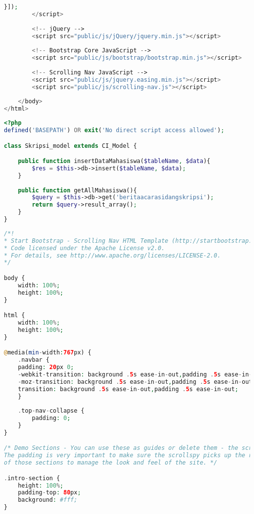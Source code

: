 \begin{lstlisting}[language=PHP,basicstyle=\tiny,caption=skripsi.php]
		}]);
		</script>
		
		<!-- jQuery -->
		<script src="public/js/jQuery/jquery.min.js"></script>
		
		<!-- Bootstrap Core JavaScript -->
		<script src="public/js/bootstrap/bootstrap.min.js"></script>
		
		<!-- Scrolling Nav JavaScript -->
		<script src="public/js/jquery.easing.min.js"></script>
		<script src="public/js/scrolling-nav.js"></script>
		
	</body>
</html>
\end{lstlisting}

\begin{lstlisting}[language=PHP,basicstyle=\tiny,caption=skripsi\_model.php]
<?php
defined('BASEPATH') OR exit('No direct script access allowed');

class Skripsi_model extends CI_Model {

	public function insertDataMahasiswa($tableName, $data){
		$res = $this->db->insert($tableName, $data);
	}
	
	public function getAllMahasiswa(){
		$query = $this->db->get('beritaacarasidangskripsi');
		return $query->result_array();
	}
}

\end{lstlisting}
\begin{lstlisting}[language=PHP,basicstyle=\tiny,caption=scrolling-nav.css]
/*!
* Start Bootstrap - Scrolling Nav HTML Template (http://startbootstrap.com)
* Code licensed under the Apache License v2.0.
* For details, see http://www.apache.org/licenses/LICENSE-2.0.
*/

body {
	width: 100%;
	height: 100%;
}

html {
	width: 100%;
	height: 100%;
}

@media(min-width:767px) {
	.navbar {
	padding: 20px 0;
	-webkit-transition: background .5s ease-in-out,padding .5s ease-in-out;
	-moz-transition: background .5s ease-in-out,padding .5s ease-in-out;
	transition: background .5s ease-in-out,padding .5s ease-in-out;
	}
	
	.top-nav-collapse {
		padding: 0;
	}
}

/* Demo Sections - You can use these as guides or delete them - the scroller will work with any sort of height, fixed, undefined, or percentage based.
The padding is very important to make sure the scrollspy picks up the right area when scrolled to. Adjust the margin and padding of sections and children 
of those sections to manage the look and feel of the site. */

.intro-section {
	height: 100%;
	padding-top: 80px;
	background: #fff;
}
\end{lstlisting}

